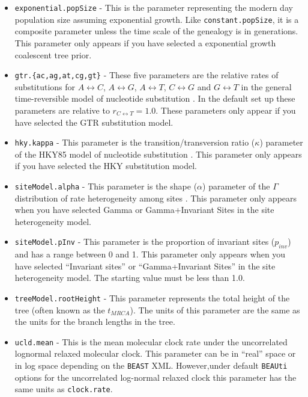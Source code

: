 \documentclass[cup7b, english]{cupbook}
\begin{document}
\begin{boxedminipage}{\textwidth}
{\begin{itemize}
\item \texttt{exponential.popSize} - This is the parameter representing the modern day population size
assuming exponential growth. Like \texttt{constant.popSize}, it is a composite parameter unless the time scale of the
genealogy is in generations. This parameter only appears if you have selected a exponential growth coalescent tree
prior.

\item \texttt{gtr.\{ac,ag,at,cg,gt\}} -	 These five parameters are the relative rates of substitutions for
$A{\leftrightarrow}C$,  $A{\leftrightarrow}G$,  $A{\leftrightarrow}T$,  $C{\leftrightarrow}G$ and  $G{\leftrightarrow}T$
in the general time-reversible model of nucleotide substitution \cite{ROMM1990}. In the default set up these parameters
are relative to $r_{C{\leftrightarrow}T} = 1.0$. These parameters only appear if you have selected the GTR substitution
model.

\item \texttt{hky.kappa} - This parameter is the transition/transversion ratio ($\kappa$) parameter of the
HKY85 model of nucleotide substitution \cite{HKY1985}. This parameter only appears if you have selected the HKY
substitution model.

\item \texttt{siteModel.alpha} -	 This parameter is the shape ($\alpha$) parameter of the $\Gamma$
distribution of rate heterogeneity among sites \cite{Y1994}. This parameter only appears when you have selected Gamma
or Gamma+Invariant Sites in the site heterogeneity model.

\item \texttt{siteModel.pInv} -	 This parameter is the proportion of  invariant sites ($p_{inv}$) and has a
range between 0 and 1. This parameter only appears when you have selected ``Invariant sites'' or ``Gamma+Invariant Sites'' in
the site heterogeneity model. The starting value must be less than 1.0.

\item \texttt{treeModel.rootHeight} -	 This parameter represents the total height of the tree (often known as
the $t_{MRCA}$). The units of this parameter are the same as the units for the branch lengths in the tree.

\item \texttt{ucld.mean} - This is the mean molecular clock rate under the uncorrelated lognormal relaxed
molecular clock. This parameter can be in ``real'' space or in log space depending on the \texttt{BEAST} XML. However,under default
\texttt{BEAUti} options for the uncorrelated log-normal relaxed clock this parameter has the same units as \texttt{clock.rate}.


\end{itemize}}
\end{boxedminipage}
\end{document}
